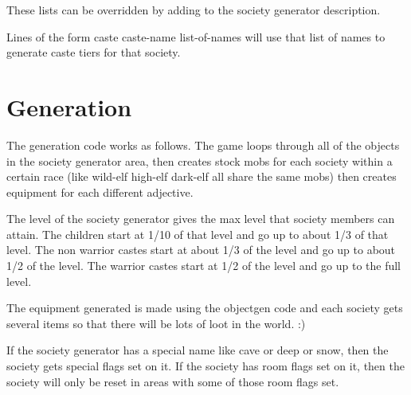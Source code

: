 These lists can be overridden by adding to the society generator 
description.

Lines of the form caste caste-name list-of-names will use that list
of names to generate caste tiers for that society. 

\section{Generation}

The generation code works as follows. The game loops through all of the
objects in the society generator area, then creates stock mobs for each
society within a certain race (like wild-elf high-elf dark-elf all
share the same mobs) then creates equipment for each different
adjective.

The level of the society generator gives the max level that society
members can attain. The children start at 1/10 of that level and
go up to about 1/3 of that level. The non warrior castes start at about
1/3 of the level and go up to about 1/2 of the level. The warrior
castes start at 1/2 of the level and go up to the full level.

The equipment generated is made using the objectgen code and each society
gets several items so that there will be lots of loot in the world. :)

If the society generator has a special name like cave or deep or snow, 
then the society gets special flags set on it. If the society has
room flags set on it, then the society will only be reset in areas
with some of those room flags set.

 

